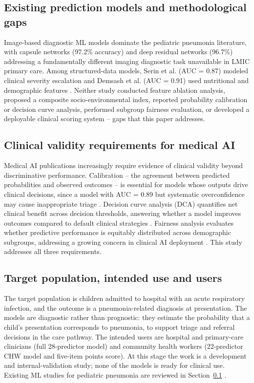 \documentclass[a4paper,fleqn]{cas-dc}
\begin{document}
\subsection{Existing prediction models and methodological gaps}
\label{sec:litrev}

Image-based diagnostic ML models dominate the pediatric pneumonia literature, with capsule networks (97.2\% accuracy) \cite{r11} and deep residual networks (96.7\%) \cite{r12} addressing a fundamentally different imaging diagnostic task unavailable in LMIC primary care. Among structured-data models, Serin et al. (AUC = 0.87) modeled clinical severity escalation \cite{r4} and Demsash et al. (AUC = 0.91) used nutritional and demographic features \cite{r7}. Neither study conducted feature ablation analysis, proposed a composite socio-environmental index, reported probability calibration or decision curve analysis, performed subgroup fairness evaluation, or developed a deployable clinical scoring system -- gaps that this paper addresses.

\subsection{Clinical validity requirements for medical AI}

Medical AI publications increasingly require evidence of clinical validity beyond discriminative performance. Calibration -- the agreement between predicted probabilities and observed outcomes -- is essential for models whose outputs drive clinical decisions, since a model with AUC = 0.89 but systematic overconfidence may cause inappropriate triage \cite{r13}. Decision curve analysis (DCA) quantifies net clinical benefit across decision thresholds, answering whether a model improves outcomes compared to default clinical strategies \cite{r4}. Fairness analysis evaluates whether predictive performance is equitably distributed across demographic subgroups, addressing a growing concern in clinical AI deployment \cite{r14}. This study addresses all three requirements.

\subsection{Target population, intended use and users}
\label{sec:tpop}
 The target population is children admitted to hospital with an acute respiratory infection, and the outcome is a pneumonia-related diagnosis at presentation. The models are diagnostic rather than prognostic: they estimate the probability that a child's presentation corresponds to pneumonia, to support triage and referral decisions in the care pathway. The intended users are hospital and primary-care clinicians (full 28-predictor model) and community health workers (22-predictor CHW model and five-item points score). At this stage the work is a development and internal-validation study; none of the models is ready for clinical use. Existing ML studies for pediatric pneumonia are reviewed in Section~\ref{sec:litrev} \cite{r4,r7}.
\end{document}
